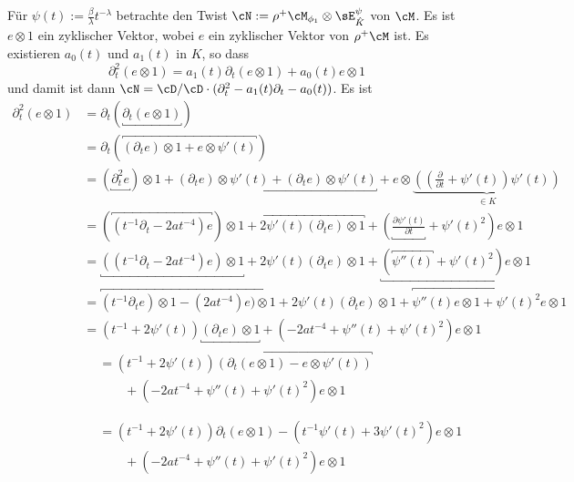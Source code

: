 \newpage\begin{try}
Für $\psi(t):=\frac{\beta}{\lambda}t^{-\lambda}$ betrachte den Twist
$\cN:=\rho^+\cM_{\phi_1}\otimes\sE_{\hat K}^\psi$ von $\cM$.  Es ist $e\otimes
1$ ein zyklischer Vektor, wobei $e$ ein zyklischer Vektor von $\rho^+\cM$ ist.
Es existieren $a_0(t)$ und $a_1(t)$ in $K$, so dass
\[
\partial_t^2 (e\otimes 1) = a_1(t)\partial_t (e\otimes 1) + a_0(t) e\otimes 1
\]
und damit ist dann $\cN=\cD/\cD\cdot(\partial_t^2-a_1(t)\partial_t-a_0(t))$.
Es ist
\begin{align*}
\partial_t^2(e\otimes 1) &= \partial_t(\underbracket{\partial_t(e\otimes 1)})
\\&= \partial_t(\overbracket{(\partial_te)\otimes 1
    + e\otimes \psi'(t)})
\\&= (\underbracket{\partial_t^2 e})\otimes 1
    + \underbracket{(\partial_t e)\otimes \psi'(t)
    +               (\partial_t e)\otimes \psi'(t)}
    + e\otimes\underset{\in K}{\underbrace{((\frac{\partial}{\partial t} 
    + \psi'(t))\psi'(t))}}
\\&= (\overbracket{(t^{-1}\partial_t - 2at^{-4}) e})\otimes 1
    + \overbracket{2\psi'(t) (\partial_t e)\otimes 1}
    + (\underbracket{\frac{\partial\psi'(t)}{\partial t}} + \psi'(t)^2)
    e\otimes 1
\\&= \underbracket{((t^{-1}\partial_t - 2at^{-4}) e)\otimes 1}
    + 2\psi'(t) (\partial_t e)\otimes 1
    + \underbracket{(\overbracket{\psi''(t)} +
    \psi'(t)^2)e\otimes 1}
\\&= \overbracket{
      (t^{-1}\partial_t e)\otimes 1
      - (2at^{-4}) e)\otimes 1
    }
    + 2\psi'(t) (\partial_t e)\otimes 1
    + \overbracket{
      \psi''(t) e\otimes 1
      + \psi'(t)^2 e\otimes 1
    }
\\&= (t^{-1} + 2\psi'(t))
    \underbracket{(\partial_t e)\otimes 1}
    + (- 2at^{-4} + \psi''(t) + \psi'(t)^2) e\otimes 1 
\\&\begin{aligned} &=
    (t^{-1} + 2\psi'(t))\overbracket{(\partial_t (e\otimes 1) -
    e\otimes \psi'(t))}
  \\&\qquad + (- 2at^{-4} + \psi''(t) + \psi'(t)^2) e\otimes 1
\\\end{aligned}
\\&\begin{aligned}
    &= (t^{-1} + 2\psi'(t))\partial_t (e\otimes 1)
    - (t^{-1} \psi'(t) + 3\psi'(t)^2)e\otimes 1
  \\&\qquad + (- 2at^{-4} + \psi''(t) + \psi'(t)^2) e\otimes 1

\end{aligned}
\end{align*}
\end{try}
